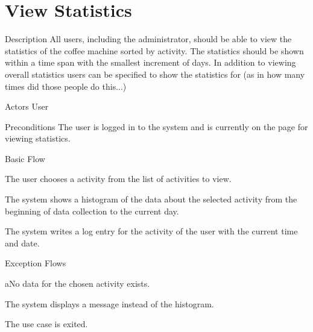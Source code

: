 \section{View Statistics}

%
\begin{cpart}{Description}
All users, including the administrator, should be able to view the statistics of the coffee machine sorted by activity. The statistics should be shown within a time span with the smallest increment of days. In addition to viewing overall statistics users can be specified to show the statistics for (as in how many times did those people do this...)
\end{cpart}


%
\begin{cpart}{Actors}
User
\end{cpart}

%
\begin{cpart}{Preconditions}
The user is logged in to the system and is currently on the page for viewing statistics.
\end{cpart}

%
\begin{cpartList}{Basic Flow}
  \item The user chooses a activity from the list of activities to view.
  \item The system shows a histogram of the data about the selected activity from the beginning of data collection to the current day.
  \item The system writes a log entry for the activity of the user with the current time and date.
\end{cpartList}

%
\begin{cpartList}{Exception Flows}
  \begin{innerList}{2}{a}{No data for the chosen activity exists.}
    \item The system displays a message instead of the histogram.
    \item The use case is exited.
  \end{innerList}
\end{cpartList}

